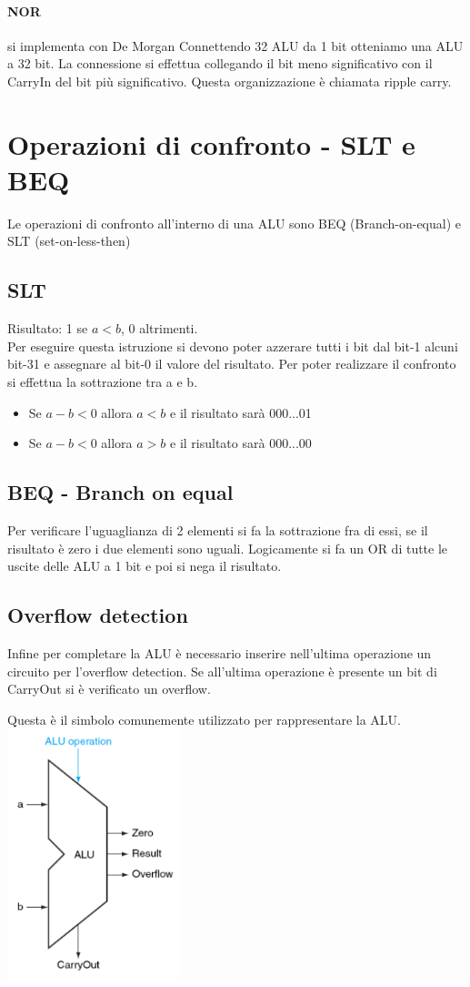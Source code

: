 \documentclass[12pt, a4paper, openany]{book}
\begin{document}
\paragraph{NOR} si implementa con De Morgan
Connettendo 32 ALU da 1 bit otteniamo una ALU a 32 bit. La connessione si effettua collegando
il bit meno significativo con il CarryIn del bit più significativo. Questa organizzazione è
chiamata ripple carry.
\section{Operazioni di confronto - SLT e BEQ}
Le operazioni di confronto all'interno di una ALU sono BEQ (Branch-on-equal)
e SLT (set-on-less-then)
\subsection{SLT}
Risultato: 1 se $a < b$, 0 altrimenti.
\\ Per eseguire questa istruzione si devono poter azzerare tutti i bit dal bit-1 alcuni
bit-31 e assegnare al bit-0 il valore del risultato.
Per poter realizzare il confronto si effettua la sottrazione tra a e b.
\begin{itemize}
    \item Se $a-b < 0$ allora $a<b$ e il risultato sarà 000...01
    \item Se $a-b < 0$ allora $a>b$ e il risultato sarà 000...00
\end{itemize}
\subsection{BEQ - Branch on equal}
Per verificare l'uguaglianza di 2 elementi si fa la sottrazione fra di essi, se il risultato
è zero i due elementi sono uguali. Logicamente si fa un OR di tutte le uscite delle ALU a 1 bit
e poi si nega il risultato.
\subsection{Overflow detection}
Infine per completare la ALU è necessario inserire nell'ultima operazione un circuito
per l'overflow detection. Se all'ultima operazione è presente un bit di CarryOut si è verificato
un overflow.
\begin{center}
    Questa è il simbolo comunemente utilizzato per rappresentare la ALU. 
    \includegraphics[width=50mm, scale=0.5]{alu_symbol.png}
\end{center}
\end{document}
